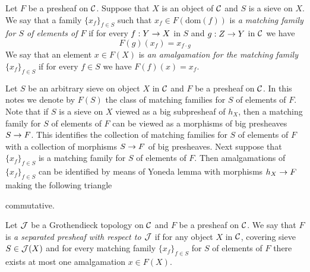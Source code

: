 \begin{definition}
Let $F$ be a presheaf on ${\mathcal C}$. Suppose that $X$ is an object of ${\mathcal C}$ and $S$ is a sieve on $X$. We say that a family $\{x_f\}_{f\in S}$ such that $x_f\in F(\mathrm{dom}(f))$ is \textit{a matching family for $S$ of elements of $F$} if for every $f:Y\rightarrow X$ in $S$ and $g:Z\rightarrow Y$ in ${\mathcal C}$ we have
$$F(g)(x_f)=x_{f\cdot g}$$
We say that an element $x\in F(X)$ is \textit{an amalgamation for the matching family} $\{x_f\}_{f\in S}$ if for every $f\in S$ we have $F(f)(x)=x_f$.
\end{definition}
\noindent
Let $S$ be an arbitrary sieve on object $X$ in ${\mathcal C}$ and $F$ be a presheaf on ${\mathcal C}$. In this notes we denote by $F(S)$ the class of matching families for $S$ of elements of $F$.\\
Note that if $S$ is a sieve on $X$ viewed as a big subpresheaf of $h_X$, then a matching family for $S$ of elements of $F$ can be viewed as a morphisms of big presheaves $S\rightarrow F$. This identifies the collection of matching families for $S$ of elements of $F$ with a collection of morphisms $S\rightarrow F$ of big presheaves. Next suppose that $\{x_f\}_{f\in S}$ is a matching family for $S$ of elements of $F$. Then amalgamations of $\{x_f\}_{f\in S}$ can be identified by means of Yoneda lemma {\cite[Theorem 3.3]{Presheaves}} with morphisms $h_X\rightarrow F$ making the following triangle
\begin{center}
\end{center}
commutative.

\begin{definition}
Let ${\mathcal J}$ be a Grothendieck topology on ${\mathcal C}$ and $F$ be a presheaf on ${\mathcal C}$. We say that $F$ is \textit{a separated presheaf with respect to ${\mathcal J}$} if for any object $X$ in ${\mathcal C}$, covering sieve $S\in {\mathcal J}(X)$ and for every matching family $\{x_f\}_{f\in S}$ for $S$ of elements of $F$ there exists at most one amalgamation $x\in F(X)$.
\end{definition} 

